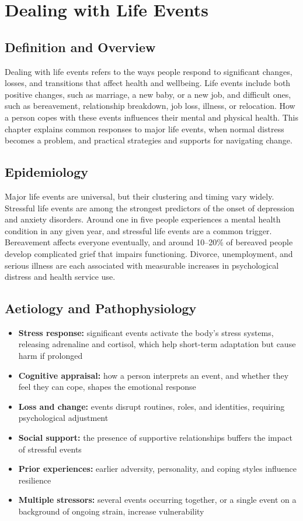 \chapter{Dealing with Life Events}

\section*{Definition and Overview}
Dealing with life events refers to the ways people respond to significant changes, losses, and transitions that affect health and wellbeing. Life events include both positive changes, such as marriage, a new baby, or a new job, and difficult ones, such as bereavement, relationship breakdown, job loss, illness, or relocation. How a person copes with these events influences their mental and physical health. This chapter explains common responses to major life events, when normal distress becomes a problem, and practical strategies and supports for navigating change.

\section*{Epidemiology}
Major life events are universal, but their clustering and timing vary widely. Stressful life events are among the strongest predictors of the onset of depression and anxiety disorders. Around one in five people experiences a mental health condition in any given year, and stressful life events are a common trigger. Bereavement affects everyone eventually, and around 10--20\% of bereaved people develop complicated grief that impairs functioning. Divorce, unemployment, and serious illness are each associated with measurable increases in psychological distress and health service use.

\section*{Aetiology and Pathophysiology}
\begin{itemize}
    \item \textbf{Stress response:} significant events activate the body's stress systems, releasing adrenaline and cortisol, which help short-term adaptation but cause harm if prolonged
    \item \textbf{Cognitive appraisal:} how a person interprets an event, and whether they feel they can cope, shapes the emotional response
    \item \textbf{Loss and change:} events disrupt routines, roles, and identities, requiring psychological adjustment
    \item \textbf{Social support:} the presence of supportive relationships buffers the impact of stressful events
    \item \textbf{Prior experiences:} earlier adversity, personality, and coping styles influence resilience
    \item \textbf{Multiple stressors:} several events occurring together, or a single event on a background of ongoing strain, increase vulnerability
\end{itemize}

